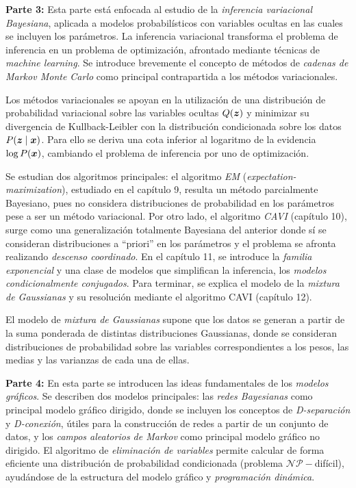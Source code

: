 \textbf{Parte 3:} Esta parte está enfocada al estudio de la \emph{inferencia variacional Bayesiana}, aplicada a modelos probabilísticos con variables ocultas en las cuales se incluyen los parámetros. La inferencia variacional transforma el problema de inferencia en un problema de optimización, afrontado mediante técnicas de \emph{machine learning}. Se introduce brevemente el concepto de métodos de \emph{cadenas de Markov Monte Carlo} como principal contrapartida a los métodos variacionales.

Los métodos variacionales se apoyan en la utilización de una distribución de probabilidad variacional sobre las variables ocultas \(Q(\bm{z})\) y minimizar su divergencia de Kullback-Leibler con la distribución condicionada sobre los datos \(P(\bm{z} \mid \bm{x})\). Para ello se deriva una cota inferior al logaritmo de la evidencia \(\log P(\bm{x})\), cambiando el problema de inferencia por uno de optimización.

Se estudian dos algoritmos principales: el algoritmo \emph{EM} (\emph{expectation-maximization}), estudiado en el capítulo 9, resulta un método parcialmente Bayesiano, pues no considera distribuciones de probabilidad en los parámetros pese a ser un método variacional. Por otro lado, el algoritmo \emph{CAVI} (capítulo 10), surge como una generalización totalmente Bayesiana del anterior donde sí se consideran distribuciones a ``priori'' en los parámetros y el problema se afronta realizando \emph{descenso coordinado}. En el capítulo 11, se introduce la \emph{familia exponencial} y una clase de modelos que simplifican la inferencia, los \emph{modelos condicionalmente conjugados}. Para terminar, se explica el modelo de la \emph{mixtura de Gaussianas} y su resolución mediante el algoritmo CAVI (capítulo 12).

El modelo de \emph{mixtura de Gaussianas} supone que los datos se generan a partir de la suma ponderada de distintas distribuciones Gaussianas, donde se consideran distribuciones de probabilidad sobre las variables correspondientes a los pesos, las medias y las varianzas de  cada una de ellas.

\textbf{Parte 4:} En esta parte se introducen las ideas fundamentales de los \emph{modelos gráficos}. Se describen dos modelos principales: las \emph{redes Bayesianas} como principal modelo gráfico dirigido, donde se incluyen los conceptos de \emph{D-separación} y \emph{D-conexión}, útiles para la construcción de redes a partir de un conjunto de datos, y los \emph{campos aleatorios de Markov} como principal modelo gráfico no dirigido. El algoritmo de \emph{eliminación de variables} permite calcular de forma eficiente una distribución de probabilidad condicionada (problema \(\mathcal{NP}-\)difícil), ayudándose de la estructura del modelo gráfico y \emph{programación dinámica}.

